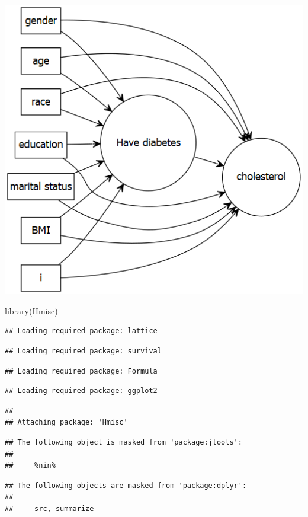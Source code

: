 \documentclass[
]{book}
\newenvironment{Shaded}{\begin{snugshade}}{\end{snugshade}}
\newcommand{\FunctionTok}[1]{\textcolor[rgb]{0.00,0.00,0.00}{#1}}
\newcommand{\NormalTok}[1]{#1}
\begin{document}
\includegraphics[width=0.65\linewidth]{images/overallnhanesplan}

\begin{Shaded}
\begin{Highlighting}[]
\FunctionTok{library}\NormalTok{(Hmisc)}
\end{Highlighting}
\end{Shaded}

\begin{verbatim}
## Loading required package: lattice
\end{verbatim}

\begin{verbatim}
## Loading required package: survival
\end{verbatim}

\begin{verbatim}
## Loading required package: Formula
\end{verbatim}

\begin{verbatim}
## Loading required package: ggplot2
\end{verbatim}

\begin{verbatim}
## 
## Attaching package: 'Hmisc'
\end{verbatim}

\begin{verbatim}
## The following object is masked from 'package:jtools':
## 
##     %nin%
\end{verbatim}

\begin{verbatim}
## The following objects are masked from 'package:dplyr':
## 
##     src, summarize
\end{verbatim}
\end{document}
